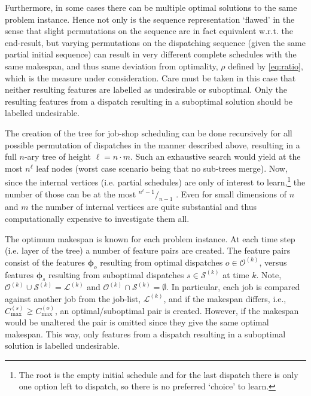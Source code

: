\documentclass[smallextended]{llncs}
\newcommand{\vphi}{{\boldsymbol{\phi}}}
\begin{document}
Furthermore, in some cases there can be multiple optimal solutions to the same problem instance. Hence not only is the 
sequence representation `flawed' in the sense that slight permutations on the sequence are in fact equivalent w.r.t. 
the end-result, but varying permutations on the dispatching sequence (given the same partial initial sequence) can 
result in very different complete schedules with the same makespan, and thus same deviation from optimality, $\rho$ 
defined by \cref{eq:ratio}, which is the measure under consideration. Care must be taken in this case that neither 
resulting features are labelled as undesirable or suboptimal. Only the resulting features from a dispatch resulting in 
a suboptimal solution should be labelled undesirable. 

The creation of the tree for job-shop scheduling can be done recursively for all possible permutation of dispatches 
in the manner described above, resulting in a full \mbox{$n$-ary} tree %
of height $\ell=n\cdot m$. Such an exhaustive search would yield at the most $n^{\ell}$ leaf nodes (worst case scenario being that no sub-trees merge). Now, since the internal vertices (i.e. partial schedules) are only of interest to learn,\footnote{The root is the empty initial schedule and for the last dispatch there is only one option left to dispatch, so there is no preferred `choice' to learn.} the number of those can be at the most \mbox{${}^{n^{\ell}-1}/_{n-1}$} \cite{Rosen03}.
Even for small dimensions of $n$ and $m$ the number of internal vertices are quite substantial and thus 
computationally expensive to investigate them all. 

The optimum makespan is known for each problem instance. 
At each time step (i.e. layer of the tree) a number of feature pairs are created. The feature pairs consist of the features 
$\vphi_o$ resulting from optimal dispatches $o\in\mathcal{O}^{(k)}$, versus features $\vphi_s$ resulting from 
suboptimal dispatches $s\in\mathcal{S}^{(k)}$ at time $k$. Note, 
$\mathcal{O}^{(k)}\cup\mathcal{S}^{(k)}=\mathcal{L}^{(k)}$ and $\mathcal{O}^{(k)}\cap\mathcal{S}^{(k)}=\emptyset$.
In particular, each job is compared against another job from the job-list, $\mathcal{L}^{(k)}$, and if the makespan differs, i.e., $C_{\max}^{(s)} \gneq C_{\max}^{(o)}$, an optimal/suboptimal pair is created. However, if the makespan would be unaltered the pair is omitted since they give the same optimal makespan. This way, only features from a dispatch resulting in a suboptimal solution is labelled undesirable.
\end{document}
